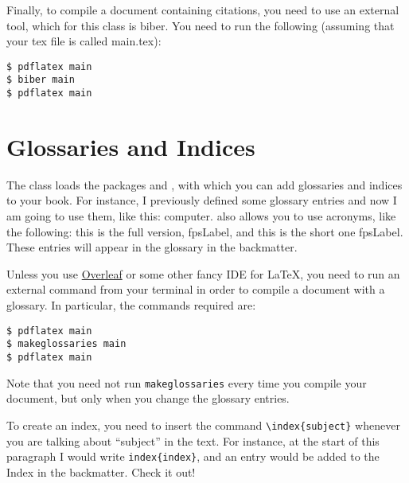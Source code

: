 Finally, to compile a document containing citations, you need to use an 
external tool, which for this class is biber. You need to run the 
following (assuming that your tex file is called main.tex):

\begin{lstlisting}[style=kaolstplain]
$ pdflatex main
$ biber main
$ pdflatex main
\end{lstlisting}

\section{Glossaries and Indices}

The  class loads the packages  and 
, with which you can add glossaries and indices to 
your book. For instance, I previously defined some glossary entries and 
now I am going to use them, like this: \gls{computer}. 
 also allows you to use acronyms, like the 
following: this is the full version, \acrfull{fpsLabel}, and this is the 
short one \acrshort{fpsLabel}. These entries will appear in the glossary 
in the backmatter.

Unless you use \href{https://www.overleaf.com}{Overleaf} or some other 
fancy IDE for \LaTeX, you need to run an external command from your 
terminal in order to compile a document with a glossary. In particular, 
the commands required are:

\begin{lstlisting}[style=kaolstplain]
$ pdflatex main
$ makeglossaries main
$ pdflatex main
\end{lstlisting}

Note that you need not run \texttt{makeglossaries} every time you 
compile your document, but only when you change the glossary entries.

To create an index, you need to insert the command 
\lstinline|\index{subject}| whenever you are talking about 
\enquote{subject} in the text. For instance, at the start of this 
paragraph I would write \lstinline|index{index}|, and an entry would be 
added to the Index in the backmatter. Check it out!


